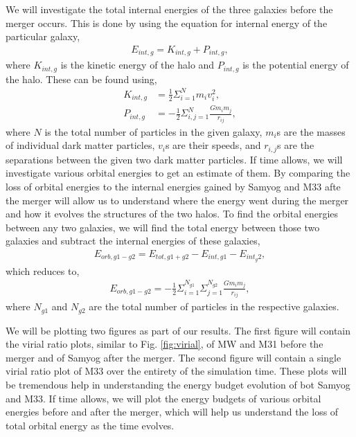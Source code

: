 \documentclass[twocolumn]{aastex631}
\begin{document}
We will investigate the total internal energies of the three galaxies before the merger occurs. This is done by using the equation for internal energy of the particular galaxy,
\begin{align}
    E_{int,g} = K_{int,g} + P_{int,g},
    \label{eq:internal_energy}
\end{align}
where $K_{int,g}$ is the kinetic energy of the halo and $P_{int,g}$ is the potential energy of the halo. These can be found using,
\begin{align}
    K_{int,g} &=\frac{1}{2}\Sigma_{i=1}^N m_i v_i^2, \nonumber \\ 
    P_{int,g} &= -\frac{1}{2} \Sigma_{i,j=1}^{N} \frac{G m_i m_j}{r_{ij}},
    \label{eq:kinetic_and_potential_energy}
\end{align}
where $N$ is the total number of particles in the given galaxy, $m_i$s are the masses of individual dark matter particles, $v_i$s are their speeds, and $r_{i,j}$s are the separations between the given two dark matter particles. If time allows, we will investigate various orbital energies to get an estimate of them. By comparing the loss of orbital energies to the internal energies gained by Samyog and M33 afte the merger will allow us to understand where the energy went during the merger and how it evolves the structures of the two halos. To find the orbital energies between any two galaxies, we will find the total energy between those two galaxies and subtract the internal energies of these galaxies,
\begin{align}
    E_{orb,g1-g2} = E_{tot,g1+g2} - E_{int,g1} - E_{int_g2}, \nonumber
\end{align}
which reduces to,
\begin{align}
    E_{orb,g1-g2} = -\frac{1}{2} \Sigma_{i=1}^{N_{g1}} \Sigma_{j=1}^{N_{g2}} \frac{G m_i m_j}{r_{ij}},
    \label{eq:orbital_energy}
\end{align}
where $N_{g1}$ and $N_{g2}$ are the total number of particles in the respective galaxies.

We will be plotting two figures as part of our results. The first figure will contain the virial ratio plots, similar to Fig. \ref{fig:virial}, of MW and M31 before the merger and of Samyog after the merger. The second figure will contain a single virial ratio plot of M33 over the entirety of the simulation time. These plots will be tremendous help in understanding the energy budget evolution of bot Samyog and M33. If time allows, we will plot the energy budgets of various orbital energies before and after the merger, which will help us understand the loss of total orbital energy as the time evolves.
\end{document}
